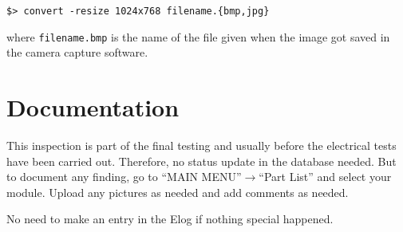 \documentclass[12pt]{unlsilabsop}
\begin{document}
\medskip

\texttt{\$> convert -resize 1024x768 filename.\{bmp,jpg\}} 
\medskip

where \texttt{filename.bmp} is the name of the file given when the image got saved in the camera capture software.

\section{Documentation}
This inspection is part of the final testing and usually before the electrical tests have been carried out. Therefore, no status update in the database needed. But to document any finding, go to ``MAIN MENU''$\rightarrow$``Part List'' and select your module. Upload any pictures as needed and add comments as needed.

No need to make an entry in the Elog if nothing special happened.
\end{document}
